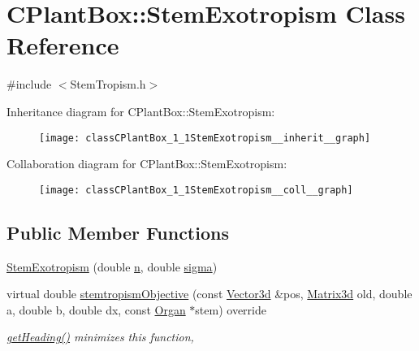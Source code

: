 \hypertarget{classCPlantBox_1_1StemExotropism}{}\section{C\+Plant\+Box\+:\+:Stem\+Exotropism Class Reference}
\label{classCPlantBox_1_1StemExotropism}


{\ttfamily \#include $<$Stem\+Tropism.\+h$>$}



Inheritance diagram for C\+Plant\+Box\+:\+:Stem\+Exotropism\+:\nopagebreak
\begin{figure}[H]
\begin{center}
\leavevmode
\texttt{[image: classCPlantBox\_1\_1StemExotropism\_\_inherit\_\_graph]}
\end{center}
\end{figure}


Collaboration diagram for C\+Plant\+Box\+:\+:Stem\+Exotropism\+:\nopagebreak
\begin{figure}[H]
\begin{center}
\leavevmode
\texttt{[image: classCPlantBox\_1\_1StemExotropism\_\_coll\_\_graph]}
\end{center}
\end{figure}
\subsection*{Public Member Functions}
\begin{DoxyCompactItemize}
\item 
\hyperlink{classCPlantBox_1_1StemExotropism_a93c4d534f4eeb86a3d4230d1b79ab269}{Stem\+Exotropism} (double \hyperlink{classCPlantBox_1_1StemTropismFunction_a54ebffbb66feb026ce61d57f17d4d25a}{n}, double \hyperlink{classCPlantBox_1_1StemTropismFunction_a79ea448c44b07fb59d85e9d130190994}{sigma})
\item 
virtual double \hyperlink{classCPlantBox_1_1StemExotropism_ad0a585b6b8c76b07bcc392499c6a44a0}{stemtropism\+Objective} (const \hyperlink{classCPlantBox_1_1Vector3d}{Vector3d} \&pos, \hyperlink{classCPlantBox_1_1Matrix3d}{Matrix3d} old, double a, double b, double dx, const \hyperlink{classCPlantBox_1_1Organ}{Organ} $\ast$stem) override
\begin{DoxyCompactList}\small\item\em \hyperlink{classCPlantBox_1_1StemTropismFunction_ac72f7ad1200d1defbb3c9b20e20d1f62}{get\+Heading()} minimizes this function, \end{DoxyCompactList}\end{DoxyCompactItemize}
